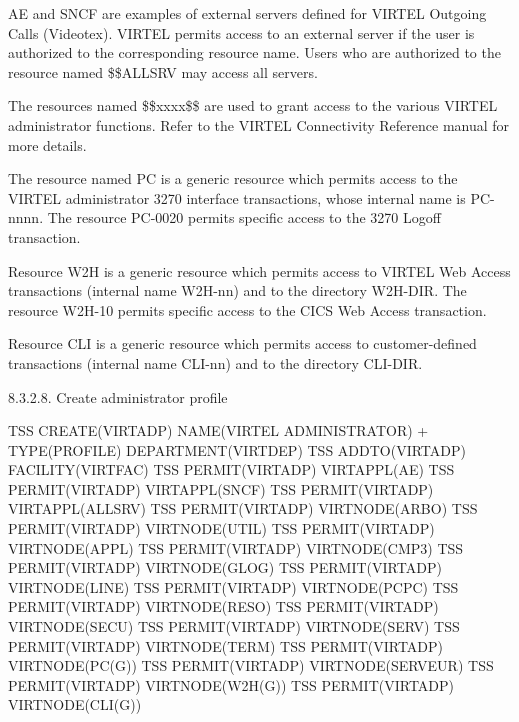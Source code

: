 \documentclass[letterpaper,10pt,english]{sphinxmanual}
\begin{document}

AE and SNCF are examples of external servers defined for VIRTEL Outgoing Calls (Videotex). VIRTEL permits access to an external server if the user is authorized to the corresponding resource name. Users who are authorized to the resource named \$\$ALLSRV may access all servers.

The resources named \$\$xxxx\$\$ are used to grant access to the various VIRTEL administrator functions. Refer to the VIRTEL Connectivity Reference manual for more details.

The resource named PC is a generic resource which permits access to the VIRTEL administrator 3270 interface transactions, whose internal name is PC-nnnn. The resource PC-0020 permits specific access to the 3270 Logoff transaction.

Resource W2H is a generic resource which permits access to VIRTEL Web Access transactions (internal name W2H-nn) and to the directory W2H-DIR. The resource W2H-10 permits specific access to the CICS Web Access transaction.

Resource CLI is a generic resource which permits access to customer-defined transactions (internal name CLI-nn) and to the directory CLI-DIR.

8.3.2.8. Create administrator profile

\begin{sphinxVerbatim}[commandchars=\\\{\}]
TSS CREATE(VIRTADP) NAME(\PYGZsq{}VIRTEL ADMINISTRATOR\PYGZsq{}) +
        TYPE(PROFILE) DEPARTMENT(VIRTDEP)
TSS ADDTO(VIRTADP) FACILITY(VIRTFAC)
TSS PERMIT(VIRTADP) VIRTAPPL(AE)
TSS PERMIT(VIRTADP) VIRTAPPL(SNCF)
TSS PERMIT(VIRTADP) VIRTAPPL(\PYGZdl{}\PYGZdl{}ALLSRV)
TSS PERMIT(VIRTADP) VIRTNODE(\PYGZdl{}\PYGZdl{}ARBO\PYGZdl{}\PYGZdl{})
TSS PERMIT(VIRTADP) VIRTNODE(\PYGZdl{}\PYGZdl{}UTIL\PYGZdl{}\PYGZdl{})
TSS PERMIT(VIRTADP) VIRTNODE(\PYGZdl{}\PYGZdl{}APPL\PYGZdl{}\PYGZdl{})
TSS PERMIT(VIRTADP) VIRTNODE(\PYGZdl{}\PYGZdl{}CMP3\PYGZdl{}\PYGZdl{})
TSS PERMIT(VIRTADP) VIRTNODE(\PYGZdl{}\PYGZdl{}GLOG\PYGZdl{}\PYGZdl{})
TSS PERMIT(VIRTADP) VIRTNODE(\PYGZdl{}\PYGZdl{}LINE\PYGZdl{}\PYGZdl{})
TSS PERMIT(VIRTADP) VIRTNODE(\PYGZdl{}\PYGZdl{}PCPC\PYGZdl{}\PYGZdl{})
TSS PERMIT(VIRTADP) VIRTNODE(\PYGZdl{}\PYGZdl{}RESO\PYGZdl{}\PYGZdl{})
TSS PERMIT(VIRTADP) VIRTNODE(\PYGZdl{}\PYGZdl{}SECU\PYGZdl{}\PYGZdl{})
TSS PERMIT(VIRTADP) VIRTNODE(\PYGZdl{}\PYGZdl{}SERV\PYGZdl{}\PYGZdl{})
TSS PERMIT(VIRTADP) VIRTNODE(\PYGZdl{}\PYGZdl{}TERM\PYGZdl{}\PYGZdl{})
TSS PERMIT(VIRTADP) VIRTNODE(PC(G))
TSS PERMIT(VIRTADP) VIRTNODE(SERVEUR)
TSS PERMIT(VIRTADP) VIRTNODE(W2H(G))
TSS PERMIT(VIRTADP) VIRTNODE(CLI(G))
\end{sphinxVerbatim}
\end{document}

